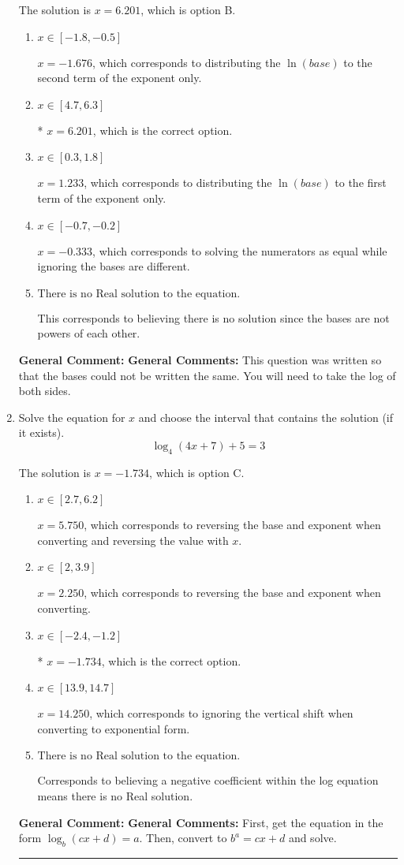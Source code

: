 \documentclass{extbook}[14pt]
\newcommand{\litem}[1]{\item #1

\rule{\textwidth}{0.4pt}}
\begin{document}
\begin{enumerate}
{The solution is \( x = 6.201 \), which is option B.\begin{enumerate}[label=\Alph*.]
\item \( x \in [-1.8, -0.5] \)

$x = -1.676$, which corresponds to distributing the $\ln(base)$ to the second term of the exponent only.
\item \( x \in [4.7, 6.3] \)

* $x = 6.201$, which is the correct option.
\item \( x \in [0.3, 1.8] \)

$x = 1.233$, which corresponds to distributing the $\ln(base)$ to the first term of the exponent only.
\item \( x \in [-0.7, -0.2] \)

$x = -0.333$, which corresponds to solving the numerators as equal while ignoring the bases are different.
\item \( \text{There is no Real solution to the equation.} \)

This corresponds to believing there is no solution since the bases are not powers of each other.
\end{enumerate}

\textbf{General Comment:} \textbf{General Comments:} This question was written so that the bases could not be written the same. You will need to take the log of both sides.
}
\litem{
Solve the equation for $x$ and choose the interval that contains the solution (if it exists).
\[ \log_{4}{(4x+7)}+5 = 3 \]

The solution is \( x = -1.734 \), which is option C.\begin{enumerate}[label=\Alph*.]
\item \( x \in [2.7, 6.2] \)

$x = 5.750$, which corresponds to reversing the base and exponent when converting and reversing the value with $x$.
\item \( x \in [2, 3.9] \)

$x = 2.250$, which corresponds to reversing the base and exponent when converting.
\item \( x \in [-2.4, -1.2] \)

* $x = -1.734$, which is the correct option.
\item \( x \in [13.9, 14.7] \)

$x = 14.250$, which corresponds to ignoring the vertical shift when converting to exponential form.
\item \( \text{There is no Real solution to the equation.} \)

Corresponds to believing a negative coefficient within the log equation means there is no Real solution.
\end{enumerate}

\textbf{General Comment:} \textbf{General Comments:} First, get the equation in the form $\log_b{(cx+d)} = a$. Then, convert to $b^a = cx+d$ and solve.
}
\end{enumerate}
\end{document}
